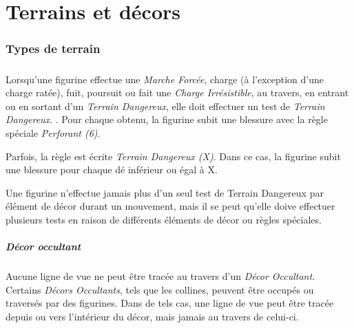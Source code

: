 
\part{Terrains et décors}

\section{Types de terrain}

\subsubsection*{}

Lorsqu'une figurine effectue une \emph{Marche Forcée}, charge (à l'exception d'une charge ratée), fuit, poursuit ou fait une \emph{Charge Irrésistible}, au travers, en entrant ou en sortant d'un \emph{Terrain Dangereux}, elle doit effectuer un test de \emph{Terrain Dangereux}. . Pour chaque  obtenu, la figurine subit une blessure avec la règle spéciale \emph{Perforant (6)}.

Parfois, la règle est écrite \emph{Terrain Dangereux (X)}. Dans ce cas, la figurine subit une blessure pour chaque dé inférieur ou égal à X.


Une figurine n'effectue jamais plus d'un seul test de Terrain Dangereux par élément de décor durant un mouvement, mais il se peut qu'elle doive effectuer plusieurs tests en raison de différents éléments de décor ou règles spéciales.

\subsubsection*{Décor occultant}

Aucune ligne de vue ne peut être tracée au travers d'un \emph{Décor Occultant}. Certains \emph{Décors Occultants}, tels que les collines, peuvent être occupés ou traversés par des figurines. Dans de tels cas, une ligne de vue peut être tracée depuis ou vers l'intérieur du décor, mais jamais au travers de celui-ci. 


